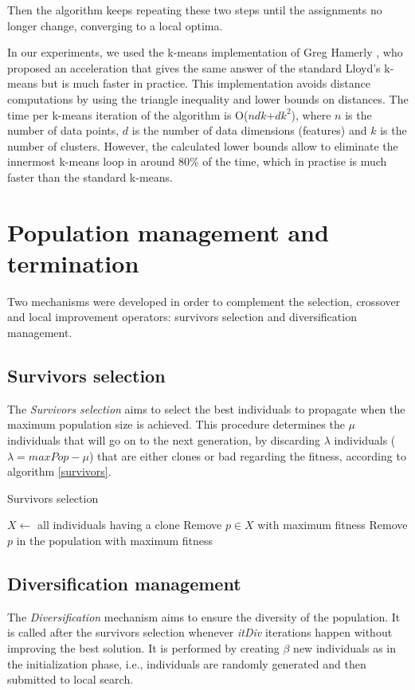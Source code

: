 Then the algorithm keeps repeating these two steps until the assignments no longer change, converging to a local optima.

In our experiments, we used the k-means implementation of Greg Hamerly \cite{Hamerly2010}, who proposed an acceleration that gives the same answer of the standard Lloyd's k-means but is much faster in practice. This implementation avoids distance computations by using the triangle inequality and lower bounds on distances. The time per k-means iteration of the algorithm is O($ndk$+$dk^2$), where $n$ is the number of data points, $d$ is the number of data dimensions (features) and $k$ is the number of clusters. However, the calculated lower bounds allow to eliminate the innermost k-means loop in around 80\% of the time, which in practise is much faster than the standard k-means.

\section{Population management and termination}
Two mechanisms were developed in order to complement the selection, crossover and local improvement operators: survivors selection and diversification management.

\subsection{Survivors selection}
The \textit{Survivors selection} aims to select the best individuals to propagate when the maximum population size is achieved. This procedure determines the $\mu$ individuals that will go on to the next generation, by discarding $\lambda$ individuals ($\lambda = maxPop - \mu$) that are either clones or bad regarding the fitness, according to algorithm \ref{survivors}.

\begin{algorithm}[H]
\caption{Survivors selection}
\label{survivors}
\begin{algorithmic}[1]
\STATE $X \leftarrow $ all individuals having a clone
\STATE Remove $p \in X$ with maximum fitness
\ELSE
\STATE Remove $p$ in the population with maximum fitness
\ENDIF
\ENDFOR
\end{algorithmic}
\end{algorithm}

\subsection{Diversification management}
The \textit{Diversification} mechanism aims to ensure the diversity of the population. It is called after the survivors selection whenever \textit{itDiv} iterations happen without improving the best solution. It is performed by creating $\beta$ new individuals as in the initialization phase, i.e., individuals are randomly generated and then submitted to local search.

